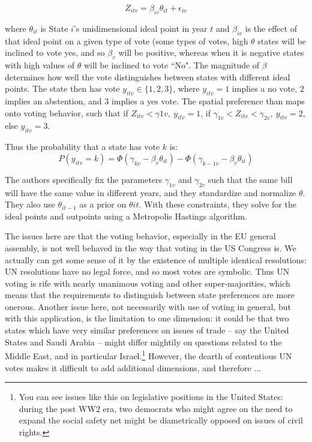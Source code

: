\documentclass[fignum,letterpaper,12pt]{amsart}
\begin{document}
\begin{equation}
Z_{itv} = \beta_{iv}\theta_{it} + \epsilon_{iv}
\end{equation}

where $\theta_{it}$ is State $i$'s unidimensional ideal point in year $t$ and $\beta_{iv}$ is the effect of that ideal point on a given type of vote (some types of votes, high $\theta$ states will be inclined to vote yes, and so $\beta_{v}$ will be positive, whereas when it is negative states with high values of $\theta$ will be inclined to vote ``No". The magnitude of $\beta$ determines how well the vote distinguishes between states with different ideal points. The state then has vote $y_{itv} \in \{1,2,3\}$, where $y_{itv} = 1$ implies a no vote, $2$ implies an abstention, and $3$ implies a yes vote. The spatial preference than maps onto voting behavior, such that if $Z_{itv} < \gamma{1v}, ~y_{itv} = 1$, if $\gamma_{1v}<Z_{itv}<\gamma_{2v},~ y_{itv} = 2$, else $y_{itv} = 3$. 

Thus the probability that a state has vote $k$ is:
\begin{equation}
P(y_{itv} = k) = \Phi(\gamma_{kv} - \beta_{v}\theta_{it}) - \Phi(\gamma_{k-1v} - \beta_{v}\theta_{it})
\end{equation}

The authors specifically fix the parameters $\gamma_{1v}$ and $\gamma_{2v}$ such that the same bill will have the same value in different years, and they standardize and normalize $\theta$. They also use $\theta_{it-1}$ as a prior on $\theta{it}$. With these constraints, they solve for the ideal points and outpoints using a Metropolis Hastings algorithm.

The issues here are that the voting behavior, especially in the EU general assembly, is not well behaved in the way that voting in the US Congress is. We actually can get some sense of it by the existence of multiple identical resolutions: UN resolutions have no legal force, and so most votes are symbolic. Thus UN voting is rife with nearly unanimous voting and other super-majorities, which means that the requirements to distinguish between state preferences are more onerous. Another issue here, not necessarily with use of voting in general, but with this application, is the limitation to one dimension: it could be that two states which have very similar preferences on issues of trade -- say the United States and  Saudi Arabia -- might differ mightily on questions related to the Middle East, and in particular Israel.\footnote{You can see issues like this on legislative positions in the United States: during the post WW2 era, two democrats who might agree on the need to expand the social safety net might be diametrically opposed on issues of civil rights.} However, the dearth of contentious UN votes makes it difficult to add additional dimensions, and therefore ...
\end{document}
